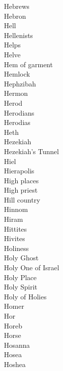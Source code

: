 Hebrews  \\
Hebron  \\
Hell  \\
Hellenists  \\
Helps  \\
Helve  \\
Hem of garment  \\
Hemlock  \\
Hephzibah  \\
Hermon  \\
Herod  \\
Herodians  \\
Herodias  \\
Heth  \\
Hezekiah  \\
Hezekiah’s Tunnel  \\
Hiel  \\
Hierapolis  \\
High places  \\
High priest  \\
Hill country  \\
Hinnom  \\
Hiram  \\
Hittites  \\
Hivites  \\
Holiness  \\
Holy Ghost  \\
Holy One of Israel  \\
Holy Place  \\
Holy Spirit  \\
Holy of Holies  \\
Homer  \\
Hor  \\
Horeb  \\
Horse  \\
Hosanna  \\
Hosea  \\
Hoshea  \\
